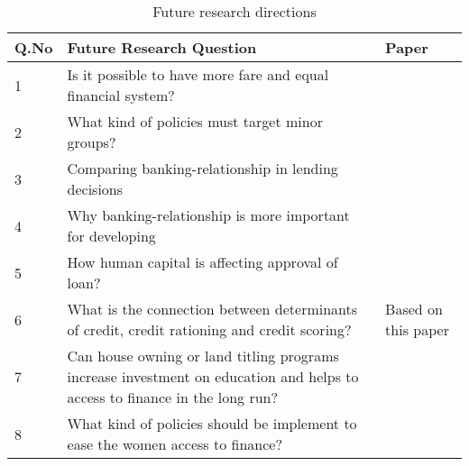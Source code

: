 \begin{table}[ht]
\centering
\footnotesize

\begin{tabular}{l
	     	    >{\raggedright\arraybackslash}p{7cm} 
	     	    l}
   	\toprule 
 Q.No & Future Research Question & Paper \\ 
   \midrule 
  1 & Is it possible to have more fare and equal financial system? & \citet{dwyer2018credit} \\
  2 & What kind of policies must target minor groups? & \citet{carter2015barriers} \\
  3 & Comparing banking-relationship in lending decisions & \citet{ullah2011literature} \\
  4 & Why banking-relationship is more important for developing & \citet{ullah2011literature} \\
  5 & How human capital is affecting approval of loan?  & \citet{bruns2008role} \\
  6 & What is the connection between determinants of credit, credit rationing and credit scoring? & Based on this paper\\
  7 & Can house owning or land titling programs increase investment on education and helps to access to finance
in the long run?  & \citet{GalianiSebastian2010Prft} \\
 8 & What kind of policies should be implement to ease the women  access to finance? & \citet{aterido2013access,GhoshSaibal2017WCFI}\\
   	\bottomrule
  \end{tabular}
\caption{Future research directions}
\label{tab:RQ}
\end{table}


